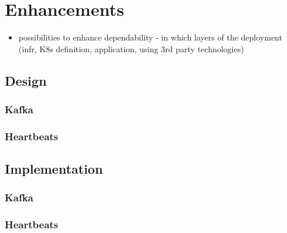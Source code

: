 \chapter{Enhancements}

\begin{itemize}
	\item possibilities to enhance dependability - in which layers of the deployment (infr, K8s definition, application, using 3rd party technologies)
\end{itemize}

\section{Design}

\subsection{Kafka}

\subsection{Heartbeats}

\section{Implementation}

\subsection{Kafka}

\subsection{Heartbeats}

